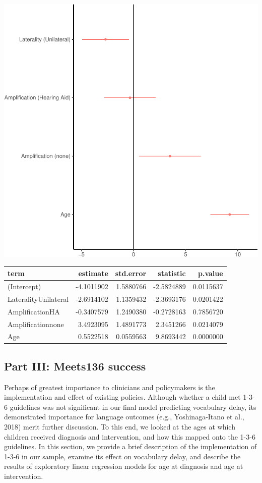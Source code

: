 \documentclass[english,man]{apa6}
\begin{document}
\includegraphics{ELSSP_paper_files/figure-latex/delay-betas-1.pdf}

\begin{table}[H]
\centering
\begin{tabular}{l|r|r|r|r}
\hline
term & estimate & std.error & statistic & p.value\\
\hline
(Intercept) & -4.1011902 & 1.5880766 & -2.5824889 & 0.0115637\\
\hline
LateralityUnilateral & -2.6914102 & 1.1359432 & -2.3693176 & 0.0201422\\
\hline
AmplificationHA & -0.3407579 & 1.2490380 & -0.2728163 & 0.7856720\\
\hline
Amplificationnone & 3.4923095 & 1.4891773 & 2.3451266 & 0.0214079\\
\hline
Age & 0.5522518 & 0.0559563 & 9.8693442 & 0.0000000\\
\hline
\end{tabular}
\end{table}

\hypertarget{part-iii-meets136-success}{%
\subsection{Part III: Meets136 success}\label{part-iii-meets136-success}}

Perhaps of greatest importance to clinicians and policymakers is the implementation and effect of existing policies. Although whether a child met 1-3-6 guidelines was not significant in our final model predicting vocabulary delay, its demonstrated importance for language outcomes (e.g., Yoshinaga-Itano et al., 2018) merit further discussion. To this end, we looked at the ages at which children received diagnosis and intervention, and how this mapped onto the 1-3-6 guidelines. In this section, we provide a brief description of the implementation of 1-3-6 in our sample, examine its effect on vocabulary delay, and describe the results of exploratory linear regression models for age at diagnosis and age at intervention.
\end{document}
